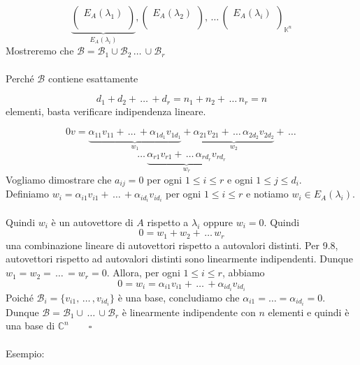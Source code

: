 \documentclass[12pt]{article}
\begin{document}
\[\underbrace{\begin{pmatrix}
E_A(\lambda_1)\\
\\
\end{pmatrix}}_{E_A(\lambda_i)}, \begin{pmatrix}
  E_A(\lambda_2)\\
  \\
\end{pmatrix}, \, \dots \, \begin{pmatrix}
    E_A(\lambda_i)\\
    \\
\end{pmatrix}_{\mathbb{K}^n}\]
Mostreremo che $\mathcal{B} = \mathcal{B}_1 \cup \mathcal{B}_2 \, \dots \, \cup \mathcal{B}_r$
\\\\
Perché $\mathcal{B}$ contiene esattamente

\[d_1 + d_2 + \, \dots \, + d_r = n_1 + n_2 + \, \dots \, n_r = n\]
elementi, basta verificare indipendenza lineare.

\[0v = \underbrace{\alpha_{11}v_{11} + \, \dots \, +  \alpha_{1d_1}v_{1d_1}}_{w_1} + \underbrace{\alpha_{21}v_{21} + \, \dots \, \alpha_{2d_2}v_{2d_2}}_{w_2} + \, \dots \,  \]
\[\dots \, \underbrace{\alpha_{r1}v_{r1} + \, \dots \, \alpha_{rd_r}v_{rd_r}}_{w_r}  \]
Vogliamo dimostrare che $a_{ij} = 0$ per ogni $1 \le i \le r$ e ogni $1 \le j \le d_i$.\\
Definiamo $w_i = \alpha_{i1}v_{i1} + \, \dots \, + \alpha_{id_i}v_{id_i}$ per ogni $1 \le i \le r$ e notiamo $w_i \in E_A(\lambda_i)$.\\\\
Quindi $w_i$ è un autovettore di $A$ rispetto a $\lambda_i$ oppure $w_i = 0$. Quindi
\[0 = w_1 + w_2 + \, \dots \, w_r\]
 una combinazione lineare di autovettori rispetto a autovalori distinti. Per 9.8, autovettori rispetto ad autovalori distinti sono linearmente indipendenti. Dunque $w_1 = w_2 = \, \dots \, = w_r = 0$.
Allora, per ogni $1 \le i \le r$, abbiamo
\[0 = w_i = \alpha_{i1}v_{i1} + \, \dots \, + \alpha_{id_i}v_{id_i}\]
Poiché $\mathcal{B}_i = \{v_{i1}, \, \dots \, , v_{id_i}\}$ è una base, concludiamo che $\alpha_{i1} = \dots = \alpha_{id_i} = 0$. Dunque $\mathcal{B} = \mathcal{B}_1 \cup \, \dots \, \cup \mathcal{B}_r$ è linearmente indipendente con $n$ elementi e quindi è una base di $\mathbb{C}^n \quad \quad \square$
\\\\
Esempio:
\end{document}
